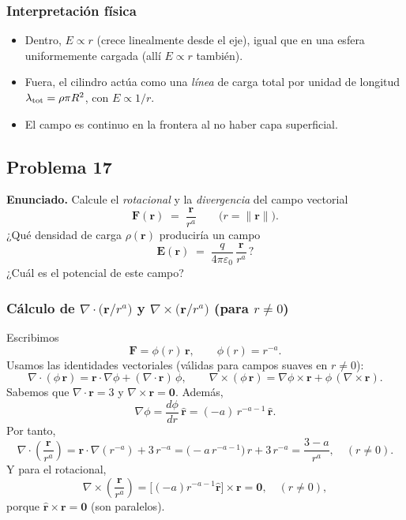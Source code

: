 \documentclass{article}
\begin{document}
\subsubsection*{Interpretación física}
\begin{itemize}
\item Dentro, $E\propto r$ (crece linealmente desde el eje), igual que en una esfera uniformemente cargada (allí $E\propto r$ también).
\item Fuera, el cilindro actúa como una \emph{línea} de carga total por unidad de longitud $\lambda_{\rm tot}=\rho\pi R^2$, con $E\propto 1/r$.
\item El campo es continuo en la frontera al no haber capa superficial.
\end{itemize}


\subsection{Problema 17} \vspace{0.5cm}

\textbf{Enunciado.} Calcule el \emph{rotacional} y la \emph{divergencia} del campo vectorial
\[
\mathbf F(\mathbf r)\;=\;\frac{\mathbf r}{r^{a}}
\qquad\big(r=\lVert\mathbf r\rVert\big).
\]
¿Qué densidad de carga $\rho(\mathbf r)$ produciría un campo
\[
\mathbf E(\mathbf r)\;=\;\frac{q}{4\pi\varepsilon_0}\,\frac{\mathbf r}{r^{a}}\,?
\]
¿Cuál es el potencial de este campo?

\subsubsection*{Cálculo de $\nabla\!\cdot\!\big(\mathbf r/r^{a}\big)$ y $\nabla\times\big(\mathbf r/r^{a}\big)$ (para $r\neq 0$)}
Escribimos
\[
\mathbf F=\phi(r)\,\mathbf r,\qquad \phi(r)=r^{-a}.
\]
Usamos las identidades vectoriales (válidas para campos suaves en $r\neq 0$):
\[
\nabla\!\cdot(\phi\,\mathbf r)=\mathbf r\!\cdot\nabla\phi+(\nabla\!\cdot\mathbf r)\,\phi,
\qquad
\nabla\times(\phi\,\mathbf r)=\nabla\phi\times\mathbf r+\phi\,(\nabla\times\mathbf r).
\]
Sabemos que $\nabla\!\cdot\mathbf r=3$ y $\nabla\times\mathbf r=\mathbf 0$. Además,
\[
\nabla\phi=\frac{d\phi}{dr}\,\hat{\mathbf r}=(-a)\,r^{-a-1}\,\hat{\mathbf r}.
\]
Por tanto,
\[
\boxed{\
\nabla\!\cdot\!\left(\frac{\mathbf r}{r^{a}}\right)
=\mathbf r\!\cdot\nabla(r^{-a})+3\,r^{-a}
=\big(-a\,r^{-a-1}\big)\,r+3\,r^{-a}
=\frac{3-a}{r^{a}},\quad (r\neq 0).\
}
\]
Y para el rotacional,
\[
\boxed{\
\nabla\times\left(\frac{\mathbf r}{r^{a}}\right)
=\big[(-a)r^{-a-1}\hat{\mathbf r}\big]\times\mathbf r
=\mathbf 0,\quad (r\neq 0),\
}
\]
porque $\hat{\mathbf r}\times\mathbf r=\mathbf 0$ (son paralelos).
\end{document}
